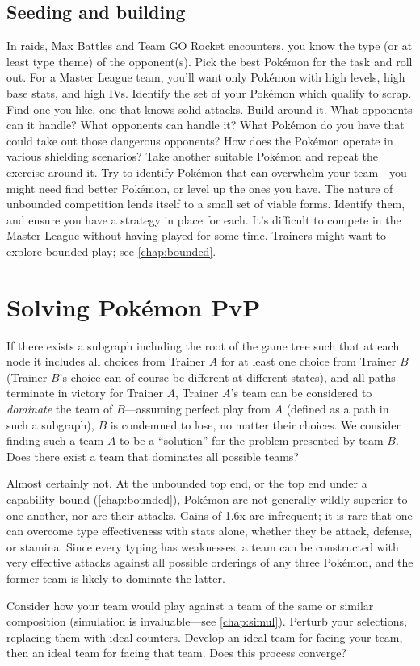 \subsection{Seeding and building\label{subsec:seeding}}
In raids, Max Battles and Team GO Rocket encounters, you know the type (or at least type theme)
 of the opponent(s).
Pick the best Pokémon for the task and roll out.
For a Master League team, you'll want only Pokémon with high levels, high base stats, and high IVs.
Identify the set of your Pokémon which qualify to scrap.
Find one you like, one that knows solid attacks.
Build around it.
What opponents can it handle?
What opponents can handle it?
What Pokémon do you have that could take out those dangerous opponents?
How does the Pokémon operate in various shielding scenarios?
Take another suitable Pokémon and repeat the exercise around it.
Try to identify Pokémon that can overwhelm your team---you might need find better
 Pokémon, or level up the ones you have.
The nature of unbounded competition lends itself to a small set of viable forms.
Identify them, and ensure you have a strategy in place for each.
It's difficult to compete in the Master League without having played for some time.
Trainers might want to explore bounded play; see \autoref{chap:bounded}.

\section{Solving Pokémon PvP\label{sec:solving}}
If there exists a subgraph including the root of the game tree such that at each
  node it includes all choices from Trainer $A$ for at least one choice from Trainer $B$
  (Trainer $B$'s choice can of course be different at different states), and all
  paths terminate in victory for Trainer $A$, Trainer $A$'s team can be considered
  to \textit{dominate} the team of $B$---assuming perfect play from $A$ (defined
  as a path in such a subgraph), $B$ is condemned to lose, no matter their choices.
We consider finding such a team $A$ to be a ``solution'' for the problem presented
  by team $B$.
Does there exist a team that dominates all possible teams?

Almost certainly not.
At the unbounded top end, or the top end under a capability bound (\autoref{chap:bounded}), Pokémon are not generally
  wildly superior to one another, nor are their attacks.
Gains of 1.6x are infrequent; it is rare that one can overcome type
  effectiveness with stats alone, whether they be attack, defense, or stamina.
Since every typing has weaknesses, a team can be constructed with
  very effective attacks against all possible orderings of any three Pokémon,
  and the former team is likely to dominate the latter.

Consider how your team would play against a team of the same or similar composition (simulation
  is invaluable---see \autoref{chap:simul}).
Perturb your selections, replacing them with ideal counters.
Develop an ideal team for facing your team, then an ideal team for facing that team.
Does this process converge?
